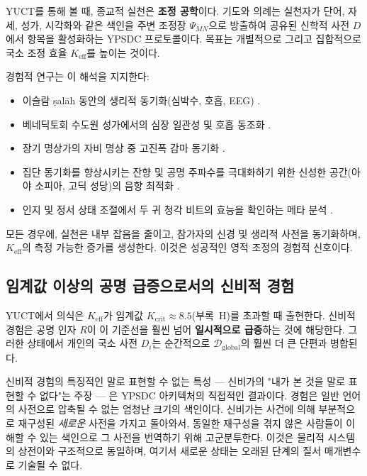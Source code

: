 \documentclass[12pt,a4paper]{article}
\begin{document}
	YUCT를 통해 볼 때, 종교적 실천은 \textbf{조정 공학}이다. 기도와 의례는 실천자가 단어, 자세, 성가, 시각화와 같은 색인을 주변 조정장 \(\Psi_{MN}\)으로 방출하여 공유된 신학적 사전 \(D\)에서 항목을 활성화하는 YPSDC 프로토콜이다. 목표는 개별적으로 그리고 집합적으로 국소 조정 효율 \(K_{\mathrm{eff}}\)를 높이는 것이다.
	
	경험적 연구는 이 해석을 지지한다:
	\begin{itemize}[leftmargin=*]
		\item 이슬람 ṣalāh 동안의 생리적 동기화(심박수, 호흡, EEG) \cite{RoyalSociety2024}.
		\item 베네딕토회 수도원 성가에서의 심장 일관성 및 호흡 동조화 \cite{Craswell2023}.
		\item 장기 명상가의 자비 명상 중 고진폭 감마 동기화 \cite{Lutz2017}.
		\item 집단 동기화를 향상시키는 잔향 및 공명 주파수를 극대화하기 위한 신성한 공간(아야 소피아, 고딕 성당)의 음향 최적화 \cite{Pentcheva2020}.
		\item 인지 및 정서 상태 조절에서 두 귀 청각 비트의 효능을 확인하는 메타 분석 \cite{Garcia2021}.
	\end{itemize}
	
	모든 경우에, 실천은 내부 잡음을 줄이고, 참가자의 신경 및 생리적 사전을 동기화하며, \(K_{\mathrm{eff}}\)의 측정 가능한 증가를 생성한다. 이것은 성공적인 영적 조정의 경험적 신호이다.
	
	\subsection{임계값 이상의 공명 급증으로서의 신비적 경험}
	
	YUCT에서 의식은 \(K_{\mathrm{eff}}\)가 임계값 \(K_{\mathrm{crit}} \approx 8.5\)(부록~H)를 초과할 때 출현한다. 신비적 경험은 공명 인자 \(R\)이 이 기준선을 훨씬 넘어 \textbf{일시적으로 급증}하는 것에 해당한다. 그러한 상태에서 개인의 국소 사전 \(D_i\)는 순간적으로 \(\mathcal{D}_{\text{global}}\)의 훨씬 더 큰 단편과 병합된다.
	
	신비적 경험의 특징적인 말로 표현할 수 없는 특성 — 신비가의 "내가 본 것을 말로 표현할 수 없다"는 주장 — 은 YPSDC 아키텍처의 직접적인 결과이다. 경험은 일반 언어의 사전으로 압축될 수 없는 엄청난 크기의 색인이다. 신비가는 사건에 의해 부분적으로 재구성된 \emph{새로운} 사전을 가지고 돌아와서, 동일한 재구성을 겪지 않은 사람들이 이해할 수 있는 색인으로 그 사전을 번역하기 위해 고군분투한다. 이것은 물리적 시스템의 상전이와 구조적으로 동일하며, 여기서 새로운 상태는 오래된 단계의 질서 매개변수로 기술될 수 없다.
	
\end{document}
